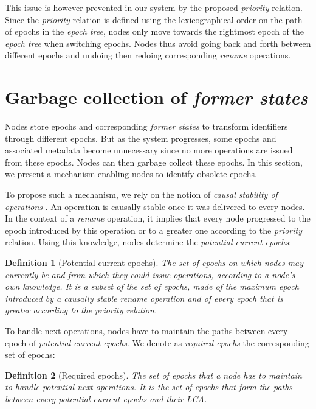 \documentclass[10pt,journal,compsoc]{IEEEtran}
\newtheorem{definition}{Definition}
\begin{document}
This issue is however prevented in our system by the proposed \emph{priority} relation.
Since the \emph{priority} relation is defined using the lexicographical order on the path of epochs in the \emph{epoch tree}, nodes only move towards the rightmost epoch of the \emph{epoch tree} when switching epochs.
Nodes thus avoid going back and forth between different epochs and undoing then redoing corresponding \emph{rename} operations.

\section{Garbage collection of \emph{former states}}

\label{sec:gc-former-states}

Nodes store epochs and corresponding \emph{former states} to transform identifiers through different epochs.
But as the system progresses, some epochs and associated metadata become unnecessary since no more operations are issued from these epochs.
Nodes can then garbage collect these epochs.
In this section, we present a mechanism enabling nodes to identify obsolete epochs.

To propose such a mechanism, we rely on the notion of \emph{causal stability of operations} \cite{10.1007/978-3-662-43352-2_11}.
An operation is causally stable once it was delivered to every nodes.
In the context of a \emph{rename} operation, it implies that every node progressed to the epoch introduced by this operation or to a greater one according to the \emph{priority} relation.
Using this knowledge, nodes determine the \emph{potential current epochs}:

\begin{definition}[Potential current epochs]
    The set of epochs on which nodes may currently be and from which they could issue operations, according to a node's own knowledge.
    It is a subset of the set of epochs, made of the maximum epoch introduced by a causally stable \emph{rename} operation and of every epoch that is greater according to the \emph{priority} relation.
\end{definition}

To handle next operations, nodes have to maintain the paths between every epoch of \emph{potential current epochs}.
We denote as \emph{required epochs} the corresponding set of epochs:

\begin{definition}[Required epochs]
    The set of epochs that a node has to maintain to handle potential next operations.
    It is the set of epochs that form the paths between every \emph{potential current epochs} and their \ac{LCA}.
\end{definition}
\end{document}
